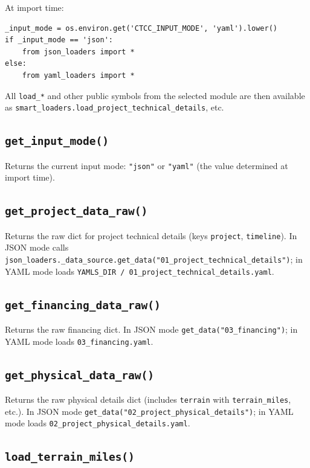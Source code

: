\documentclass[ctcc_full_documentation.tex]{subfiles}
\begin{document}
At import time:
\begin{lstlisting}
_input_mode = os.environ.get('CTCC_INPUT_MODE', 'yaml').lower()
if _input_mode == 'json':
    from json_loaders import *
else:
    from yaml_loaders import *
\end{lstlisting}
All \texttt{load\_*} and other public symbols from the selected module are then available as \texttt{smart\_loaders.load\_project\_technical\_details}, etc.

\subsection{\texttt{get\_input\_mode()}}

Returns the current input mode: \texttt{"json"} or \texttt{"yaml"} (the value determined at import time).

\subsection{\texttt{get\_project\_data\_raw()}}

Returns the raw dict for project technical details (keys \texttt{project}, \texttt{timeline}). In JSON mode calls \texttt{json\_loaders.\_data\_source.get\_data("01\_project\_technical\_details")}; in YAML mode loads \texttt{YAMLS\_DIR / 01\_project\_technical\_details.yaml}.

\subsection{\texttt{get\_financing\_data\_raw()}}

Returns the raw financing dict. In JSON mode \texttt{get\_data("03\_financing")}; in YAML mode loads \texttt{03\_financing.yaml}.

\subsection{\texttt{get\_physical\_data\_raw()}}

Returns the raw physical details dict (includes \texttt{terrain} with \texttt{terrain\_miles}, etc.). In JSON mode \texttt{get\_data("02\_project\_physical\_details")}; in YAML mode loads \texttt{02\_project\_physical\_details.yaml}.

\subsection{\texttt{load\_terrain\_miles()}}
\end{document}
